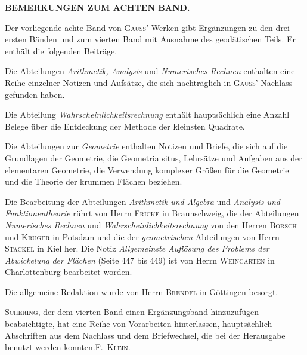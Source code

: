 \begin{center}\Large\bfseries BEMERKUNGEN ZUM ACHTEN BAND.\end{center}

Der vorliegende achte Band von \textsc{Gauss}' Werken gibt Ergänzungen zu den drei ersten Bänden und zum vierten Band mit Ausnahme des geodätischen Teils. Er enthält die folgenden Beiträge.

Die Abteilungen \textit{Arithmetik, Analysis} und \textit{Numerisches Rechnen} enthalten eine Reihe einzelner Notizen und Aufsätze, die sich nachträglich in \textsc{Gauss}' Nachlass gefunden haben.

Die Abteilung \textit{Wahrscheinlichkeitsrechnung} enthält hauptsächlich eine Anzahl Belege über die Entdeckung der Methode der kleinsten Quadrate.

Die Abteilungen zur \textit{Geometrie} enthalten Notizen und Briefe, die sich auf die Grundlagen der Geometrie, die Geometria situs, Lehrsätze und Aufgaben aus der elementaren Geometrie, die Verwendung komplexer Größen für die Geometrie und die Theorie der krummen Flächen beziehen.

Die Bearbeitung der Abteilungen \textit{Arithmetik und Algebra} und \textit{Analysis und Funktionentheorie} rührt von Herrn \textsc{Fricke} in Braunschweig, die der Abteilungen \textit{Numerisches Rechnen} und \textit{Wahrscheinlichkeitsrechnung} von den Herren \textsc{Börsch} und \textsc{Krüger} in Potsdam und die der \textit{geometrischen} Abteilungen von Herrn \textsc{Stäckel} in Kiel her. Die Notiz \textit{Allgemeinste Auflösung des Problems der Abwickelung der Flächen} (Seite 447 bis 449) ist von Herrn \textsc{Weingarten} in Charlottenburg bearbeitet worden.

Die allgemeine Redaktion wurde von Herrn \textsc{Brendel} in Göttingen besorgt.

\textsc{Schering}, der dem vierten Band einen Ergänzungsband hinzuzufügen beabsichtigte, hat eine Reihe von Vorarbeiten hinterlassen, hauptsächlich Abschriften aus dem Nachlass und dem Briefwechsel, die bei der Herausgabe benutzt werden konnten.\hfill\mbox{\textsc{F. Klein.}}
